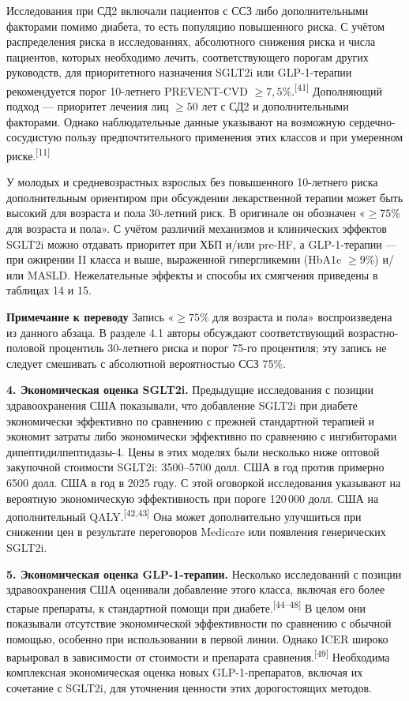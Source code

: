 \documentclass[11pt,a4paper]{article}
\newcommand{\src}[1]{\textsuperscript{[#1]}}
\newcommand{\editorial}[1]{\par\begingroup\small\color{black!70}\textbf{Примечание к переводу} #1\par\endgroup}
\begin{document}
Исследования при СД2 включали пациентов с ССЗ либо дополнительными факторами помимо диабета, то есть популяцию повышенного риска. С учётом распределения риска в исследованиях, абсолютного снижения риска и числа пациентов, которых необходимо лечить, соответствующего порогам других руководств, для приоритетного назначения SGLT2i или GLP-1-терапии рекомендуется порог 10-летнего PREVENT-CVD $\geq7{,}5\%$.\src{41} Дополняющий подход --- приоритет лечения лиц $\geq50$ лет с СД2 и дополнительными факторами. Однако наблюдательные данные указывают на возможную сердечно-сосудистую пользу предпочтительного применения этих классов и при умеренном риске.\src{11}

У молодых и средневозрастных взрослых без повышенного 10-летнего риска дополнительным ориентиром при обсуждении лекарственной терапии может быть высокий для возраста и пола 30-летний риск. В оригинале он обозначен «$\geq75\%$ для возраста и пола». С учётом различий механизмов и клинических эффектов SGLT2i можно отдавать приоритет при ХБП и/или pre-HF, а GLP-1-терапии --- при ожирении II класса и выше, выраженной гипергликемии (HbA1c $\geq9\%$) и/или MASLD. Нежелательные эффекты и способы их смягчения приведены в таблицах 14 и 15.

\editorial{Запись «$\geq75\%$ для возраста и пола» воспроизведена из данного абзаца. В разделе 4.1 авторы обсуждают соответствующий возрастно-половой процентиль 30-летнего риска и порог 75-го процентиля; эту запись не следует смешивать с абсолютной вероятностью ССЗ 75\%.}

\textbf{4. Экономическая оценка SGLT2i.} Предыдущие исследования с позиции здравоохранения США показывали, что добавление SGLT2i при диабете экономически эффективно по сравнению с прежней стандартной терапией и экономит затраты либо экономически эффективно по сравнению с ингибиторами дипептидилпептидазы-4. Цены в этих моделях были несколько ниже оптовой закупочной стоимости SGLT2i: 3500--5700 долл. США в год против примерно 6500 долл. США в год в 2025 году. С этой оговоркой исследования указывают на вероятную экономическую эффективность при пороге 120\,000 долл. США на дополнительный QALY.\src{42,43} Она может дополнительно улучшиться при снижении цен в результате переговоров Medicare или появления генерических SGLT2i.

\textbf{5. Экономическая оценка GLP-1-терапии.} Несколько исследований с позиции здравоохранения США оценивали добавление этого класса, включая его более старые препараты, к стандартной помощи при диабете.\src{44--48} В целом они показывали отсутствие экономической эффективности по сравнению с обычной помощью, особенно при использовании в первой линии. Однако ICER широко варьировал в зависимости от стоимости и препарата сравнения.\src{49} Необходима комплексная экономическая оценка новых GLP-1-препаратов, включая их сочетание с SGLT2i, для уточнения ценности этих дорогостоящих методов.
\end{document}

